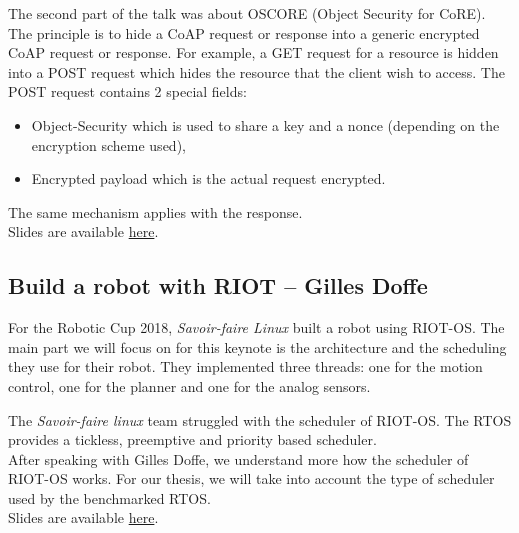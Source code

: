 \documentclass[journal, a4paper]{../IEEEtran}
\begin{document}
The second part of the talk was about OSCORE (Object Security for CoRE).
The principle is to hide a CoAP request or response into a generic encrypted CoAP request or response.
For example, a GET request for a resource is hidden into a POST request which hides the resource that the client wish to access.
The POST request contains 2 special fields:
\begin{itemize}
    \item Object-Security which is used to share a key and a nonce (depending on the encryption scheme used),
    \item Encrypted payload which is the actual request encrypted.
\end{itemize}
The same mechanism applies with the response.\\


Slides are available \href{http://summit.riot-os.org/2018/wp-content/uploads/sites/10/2018/09/1_3-Christian-Asmuess-CoAP-RD.pdf}{here}.

\subsection{Build a robot with RIOT -- Gilles Doffe}
For the Robotic Cup 2018, \textit{Savoir-faire Linux} built a robot using RIOT-OS.
The main part we will focus on for this keynote is the architecture and the scheduling they use for their robot.
They implemented three threads: one for the motion control, one for the planner and one for the analog sensors.
 
The \textit{Savoir-faire linux} team struggled with the scheduler of RIOT-OS. 
The RTOS provides a tickless, preemptive and priority based scheduler. \\

After speaking with Gilles Doffe, we understand more how the scheduler of RIOT-OS works.
For our thesis, we will take into account the type of scheduler used by the benchmarked RTOS. \\



Slides are available \href{http://summit.riot-os.org/2018/wp-content/uploads/sites/10/2018/09/2_1-Gille-Doffe-RIOT-Robot.pdf}{here}.
\end{document}

